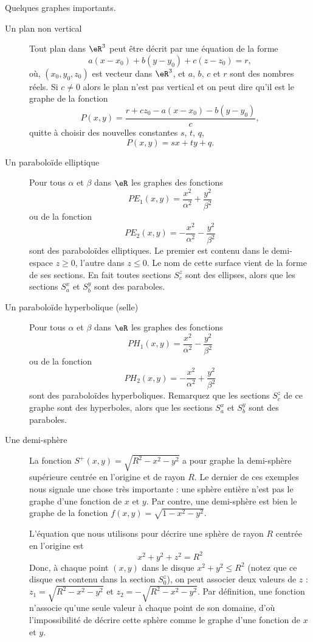 \begin{example}
	Quelques graphes importants.
	\begin{description}
		\item[Un plan non vertical] Tout plan dans \( \eR^3\) peut être décrit par une équation de la forme
		      \[
			      a(x-x_0)+ b(y-y_0) + c(z-z_0) = r,
		      \]
		      où, \( (x_0, y_0, z_0)\) est vecteur dans \( \eR^3\), et \( a\), \( b\), \( c\) et \( r\) sont des nombres réels. Si \( c\neq 0\) alors le plan n'est pas vertical et on peut dire qu'il est le graphe de la fonction
		      \[
			      P(x,y)= \frac{r+cz_0 -a(x-x_0)-b(y-y_0)}{c},
		      \]
		      quitte à choisir des nouvelles constantes \( s\), \( t\), \( q\),
		      \[
			      P(x,y)=sx +ty +q.
		      \]
		\item[Un paraboloïde elliptique] Pour tous \( \alpha\) et \( \beta\) dans \( \eR\) les  graphes des fonctions
		      \[
			      PE_1(x,y)=\frac{x^2}{\alpha^2}+\frac{y^2}{\beta^2}
		      \]
		      ou de la fonction
		      \[
			      PE_2(x,y)=-\frac{x^2}{\alpha^2}-\frac{y^2}{\beta^2}
		      \]
		      sont des paraboloïdes elliptiques. Le premier est contenu dans le demi-espace \( z\geq 0\), l'autre dans \( z\leq 0\). Le nom de cette surface vient de la forme de ses sections. En fait toutes  sections \( S^z_c\) sont des ellipses, alors que les sections \( S^x_a\) et \( S^y_b\) sont des paraboles.
		\item[Un paraboloïde hyperbolique (selle)]  Pour tous \( \alpha\) et \( \beta\) dans \( \eR\) les  graphes des fonctions
		      \[
			      PH_1(x,y)=\frac{x^2}{\alpha^2}-\frac{y^2}{\beta^2}
		      \]
		      ou de la fonction
		      \[
			      PH_2(x,y)=-\frac{x^2}{\alpha^2}+\frac{y^2}{\beta^2}
		      \]
		      sont des paraboloïdes hyperboliques. Remarquez que les  sections \( S^z_c\) de ce graphe sont des hyperboles, alors que les sections \( S^x_a\) et \( S^y_b\) sont des paraboles.
		\item[Une demi-sphère] La fonction \( S^+(x,y)=\sqrt{R^2-x^2-y^2}\) a pour graphe la demi-sphère supérieure centrée en l'origine et de rayon \( R\).
		      Le dernier de ces exemples nous signale une chose très importante : une sphère entière n'est pas le graphe d'une fonction de \( x\) et \( y\). Par contre, une demi-sphère est bien le graphe de la fonction \( f(x,y)=\sqrt{1-x^2-y^2}\).

		      L'équation que nous utilisons  pour décrire une sphère de rayon \( R\) centrée en l'origine est
		      \[
			      x^2+y^2+z^2=R^2
		      \]
		      Donc, à  chaque point  \( (x,y)\) dans le disque \( x^2+y^2\leq R^2\) (notez que ce disque est contenu dans la section \( S^z_0\)), on peut associer deux valeurs de \( z\) : \( z_1=\sqrt{R^2-x^2-y^2}\) et  \( z_2=-\sqrt{R^2-x^2-y^2}\). Par définition, une fonction n'associe qu'une seule valeur à chaque point de son domaine, d'où l'impossibilité de décrire cette sphère comme le graphe d'une fonction de \( x\) et \( y\).
	\end{description}
\end{example}

